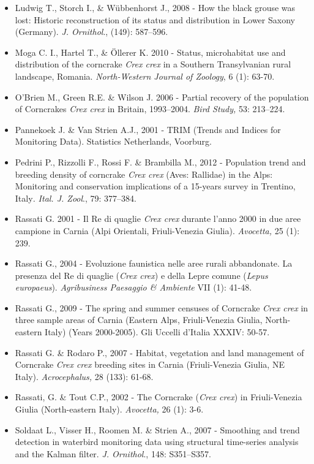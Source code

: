 \begin{itemize}
	\item Ludwig T., Storch I., \& W\"ubbenhorst J., 2008 - How the black grouse
was lost: Historic reconstruction of its status and distribution in
Lower Saxony (Germany). \textit{J. Ornithol}., (149): 587{}--596.

	\item Moga C. I., Hartel T., \& \"Ollerer K. 2010 - Status, microhabitat use
and distribution of the corncrake \textit{Crex crex }in a Southern
Transylvanian rural landscape, Romania. \textit{North-Western Journal
of Zoology}, 6 (1): 63-70.

	\item O{\textquoteright}Brien M., Green R.E. \& Wilson J. 2006 - Partial
recovery of the population of Corncrakes \textit{Crex crex }in Britain,
1993{}--2004. \textit{Bird Study,} 53: 213{}--224.

	\item Pannekoek J. \& Van Strien A.J., 2001 - TRIM (Trends and Indices for
Monitoring Data). Statistics Netherlands, Voorburg. 

	\item Pedrini P., Rizzolli F., Rossi F. \& Brambilla M., 2012 - Population
trend and breeding density of corncrake \textit{Crex crex} (Aves:
Rallidae) in the Alps: Monitoring and conservation implications of a
15-years survey in Trentino, Italy\textit{. }\textit{Ital. J. Zool}.,
79: 377{}--384.

	\item {Rassati G. 2001 - Il Re
di quaglie
}\textit{{Crex
crex}}{ durante
l{\textquoteright}anno 2000 in due aree campione in Carnia (Alpi
Orientali, Friuli-Venezia Giulia).
}\textit{{Avocetta,}}{
25 (1): 239.}

	\item {Rassati G., 2004 -
Evoluzione faunistica nelle aree rurali abbandonate. La presenza del Re
di quaglie
(}\textit{{Crex
crex}}{) e della Lepre
comune (}\textit{{Lepus
europaeus}}{).
}\textit{{Agribusiness
Paesaggio \&
Ambiente}}{ VII (1):
41-48.}

	\item {Rassati G.,
}{2009 -
}{The spring and summer
censuses of Corncrake
}\textit{{Crex
crex}}{ in three sample
areas of Carnia (Eastern Alps, Friuli-Venezia Giulia, North-eastern
Italy) (Years 2000-2005).
}{Gli Uccelli
d{\textquoteright}Italia XXXIV: 50-57.}

	\item {Rassati G. \& Rodaro
P., }{2007 - Habitat,
vegetation and land management of Corncrake
}\textit{{Crex
crex}}{ breeding sites
in Carnia (Friuli-Venezia Giulia, NE Italy).
}\textit{{Acrocephalus,}}{
28 (133): 61-68.}

	\item {Rassati, G. \& Tout
C.P., 2002 - }{The
Corncrake
(}\textit{{Crex
crex}}{) in
Friuli-Venezia Giulia (North-eastern Italy).
}\textit{{Avocetta,}}{
26 (1): 3-6.}

	\item {Soldaat L., Visser H.,
Roomen M. \& Strien A.,
}{2007 -
}{Smoothing and }trend
detection in waterbird monitoring data using structural time-series
{analysis and the
Kalman filter.
}\textit{{J.
Ornithol}}{.,
}{148:
}{S351}{{}--}{S357.}
\end{itemize}
